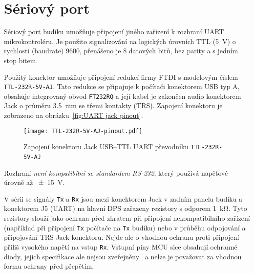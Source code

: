 \section{Sériový port}
Sériový port budíku umožňuje připojení jiného zařízení k rozhraní \acs{UART}
mikrokontroléru. Je použito signalizování na logických úrovních \acs{TTL}
(\SI{5}{\volt}) o rychlosti (\foreignlanguage{english}{baudrate})
\SI{9600}{\baud}, přenášeno je \num{8} datových bitů, bez parity a s jedním
stop bitem.

Použitý konektor umožňuje připojení redukcí firmy FTDI s modelovým číslem
\texttt{TTL-232R-5V-AJ}. Tato redukce se připojuje k počítači konektorem USB
typ A, obsahuje integrovaný obvod \texttt{FT232RQ} a její kabel je zakončen
audio konektorem Jack o průměru \SI{3,5}{\milli\meter} se třemi kontakty (TRS).
Zapojení konektoru je zobrazeno na obrázku~\vref{fig:UART jack pinout}.

\begin{figure}[htbp]
    \centering
    \texttt{[image: TTL-232R-5V-AJ-pinout.pdf]}
    \caption{%
        Zapojení konektoru Jack USB--TTL UART převodníku
        \texttt{TTL-232R-5V-AJ}~\cite{TTL-232R}
    }
    \label{fig:UART jack pinout}
\end{figure}

Rozhraní \emph{není kompatibilní se standardem RS-232}, který používá napěťové
úrovně až \SI{\pm15}{\volt}.

V sérii se signály \texttt{Tx} a \texttt{Rx} jsou mezi konektorem Jack v zadním
panelu budíku a konektorem J5 (UART) na hlavní DPS zařazeny rezistory s odporem
\SI{1}{\kilo\ohm}. Tyto rezistory slouží jako ochrana
před zkratem při připojení nekompatibilního zařízení (například při připojení
\texttt{Tx} počítače na \texttt{Tx} budíku) nebo v průběhu odpojování
a připojování TRS Jack konektoru. Nejde ale o vhodnou ochranu proti připojení
příliš vysokého napětí na vstup \texttt{Rx}. Vstupní piny \acs{MCU} sice
obsahují ochranné diody, jejich specifikace ale nejsou
zveřejněny~\cite{dshATmega328} a nelze je považovat za vhodnou formu ochrany
před přepětím.
